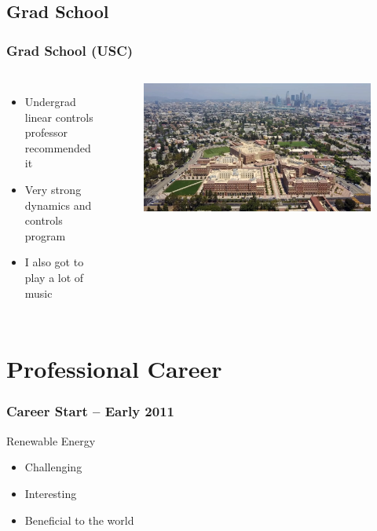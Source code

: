 \documentclass[aspectratio=169]{beamer}
\begin{document}
\subsection{Grad School}
\begin{frame}
  \frametitle{Grad School (USC)}
  \begin{columns}[t]
    \begin{itemize}
    \item Undergrad linear controls professor recommended it
    \item Very strong dynamics and controls
      program
    \item I also got to play a lot of music
    \end{itemize}

    \begin{figure}
      \includegraphics[width=0.7\linewidth]{USC.jpg}
    \end{figure}
  \end{columns}
\end{frame}

\section{Professional Career}

\begin{frame}
  \frametitle{Career Start -- Early 2011}
  \begin{block}{Renewable Energy}
    \begin{itemize}
      \item Challenging
      \item Interesting
      \item Beneficial to the world
    \end{itemize}
  \end{block}  
\end{frame}
\end{document}

